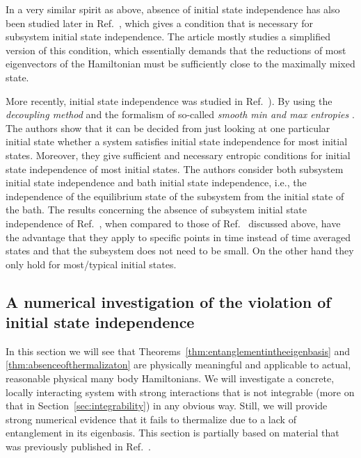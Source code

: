 \documentclass[a4paper,12pt,listof=totoc,index=totoc,bibliography=totoc,headsepline=false,headings=normal,BCOR16.153846mm,DIV12,headinclude,twoside,cleardoublepage=empty,numbers=noenddot,final]{scrreprt}
\theoremstyle{mystyle}
\numberwithin{equation}{section}
\numberwithin{figure}{section}
\numberwithin{lemma}{section}
\numberwithin{theorem}{section}
\numberwithin{corollary}{section}
\numberwithin{definition}{section}
\numberwithin{conjecture}{section}
\numberwithin{observation}{section}
\newcommand{\+}{\mkern2mu}
\DeclareMathOperator{\1}{\mathds{1}}
\begin{document}
In a very similar spirit as above, absence of initial state independence has also been studied later in Ref.~\cite{PhysRevE.82.01}, which gives a condition that is necessary for subsystem initial state independence.
The article mostly studies a simplified version of this condition, which essentially demands that the reductions of most eigenvectors of the Hamiltonian must be sufficiently close to the maximally mixed state.

More recently, initial state independence was studied in Ref.~\cite{Hutter11,MasterThesisHutter}).
By using the \emph{decoupling method} \cite{Dupuis2010,1109.4348v1,Szehr2012} and the formalism of so-called \emph{smooth min and max entropies} \cite{Koenig08,Ciganovic2013}.
The authors show that it can be decided from just looking at one particular initial state whether a system satisfies initial state independence for most initial states.
Moreover, they give sufficient and necessary entropic conditions for initial state independence of most initial states.
The authors consider both subsystem initial state independence and bath initial state independence, i.e., the independence of the equilibrium state of the subsystem from the initial state of the bath. 
The results concerning the absence of subsystem initial state independence of Ref.~\cite{Hutter11}, when compared to those of Ref.~\cite{PhysRevLett.10-6} discussed above, have the advantage that they apply to specific points in time instead of time averaged states and that the subsystem does not need to be small.
On the other hand they only hold for most/typical initial states.


\subsection{A numerical investigation of the violation of initial state independence}
\label{sec:anumericalinvestigationoftheviolationofinitialstateindependence}
%
In this section we will see that Theorems~\ref{thm:entanglementintheeigenbasis} and \ref{thm:absenceofthermalizaton} are physically meaningful and applicable to actual, reasonable physical many body Hamiltonians.
We will investigate a concrete, locally interacting system with strong interactions that is not integrable (more on that in Section~\ref{sec:integrability}) in any obvious way.
Still, we will provide strong numerical evidence that it fails to thermalize due to a lack of entanglement in its eigenbasis.
This section is partially based on material that was previously published in Ref.~\cite{PhysRevLett.10-6}.
\end{document}
